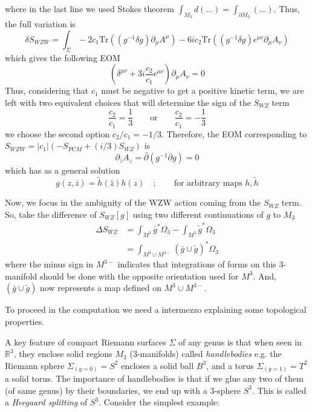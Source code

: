 \documentclass[a4paper,12pt]{article}
\numberwithin{equation}{section}
\numberwithin{thm}{section}
\numberwithin{exm}{section}
\newcommand{\p}{\partial}
\newcommand{\pb}{\bar\partial}
\newcommand{\tr}{\mathrm{Tr}}
\newcommand{\wt}{\widetilde}
\newcommand{\mo}{^{-1}}
\newcommand{\R}{{\mathbb R}}
\newcommand{\zb}{{\bar z}}
\newcommand{\<}{{\langle}}
\renewcommand{\>}{{\rangle}}
\renewcommand{\d}{{\delta}}
\newcommand{\D}{{\Delta}}
\newcommand{\e}{{\epsilon}}
\newcommand{\m}{{\mu}}
\newcommand{\n}{{\nu}}
\newcommand{\Om}{{\Omega}}
\renewcommand{\S}{{\Sigma}}
\begin{document}
where in the last line we used Stokes theorem $\int_{M_3} d(...) = \int_{\p M_3} (...)$. Thus, the full variation is
	\begin{equation}
	\d S_{WZW} = \int_\S -2c_1\tr((g^{-1}\d g)\p_\mu A^\m) -6ic_2 \tr((g^{-1}\delta g) \e^{\m\n}\p_\mu A_\nu)
	\end{equation}
which gives the following EOM
	\begin{equation}
	\left(\d^{\m\n} + 3i \frac{c_2}{c_1} \e^{\m\n}\right)\p_\m A_\n = 0
	\end{equation}
Thus, considering that $c_1$ must be negative to get a positive kinetic term, we are left with two equivalent choices that will determine the sign of the $S_{WZ}$ term
	\begin{equation}
	\frac{c_2}{c_1} = \frac{1}{3}\qquad\text{or}\qquad\frac{c_2}{c_1} = -\frac{1}{3}
	\end{equation}
we choose the second option $c_2/c_1 = - 1/3$. Therefore, the EOM corresponding to $S_{WZW} = |c_1|(-S_{PCM} + (i/3)S_{WZ})$ is
	\begin{equation}
	\p_\zb A_z = \pb(g\mo \p g) = 0
	\end{equation}
which has as a general solution
	\begin{equation}
	g(z,\zb) = \wt h(\zb) h(z)\quad;\qquad\text{for arbitrary maps }h, \wt h
	\end{equation}

Now, we focus in the ambiguity of the WZW action coming from the $S_{WZ}$ term. So, take the difference of $S_{WZ}[g]$ using two different continuations of $g$ to $M_3$
	\begin{align}
	\D S_{WZ} & = \int_{M^3} \bar g^*\Om_3 - \int_{M^3} \wt g^*\Om_3 \\
	& = \int_{M^3 \cup M^{3-}} (\bar g \cup \wt g)^* \Om_3
	\end{align}
where the minus sign in $M^{3-}$ indicates that integrations of forms on this 3-manifold should be done with the opposite orientation used for $M^3$. And, $(\bar g \cup \wt g)$ now represents a map defined on $M^3 \cup M^{3-}$.

To proceed in the computation we need a intermezzo explaining some topological properties.

A key feature of compact Riemann surfaces $\S$ of any genus is that when seen in $\R^3$, they enclose solid regions $M_3$ (3-manifolds) called {\it handlebodies} e.g. the Riemann sphere $\S_{(g=0)} = S^2$ encloses a solid ball $B^3$, and a torus $\S_{(g=1)} = T^2$ a solid torus. The importance of handlebodies is that if we glue any two of them (of same genus) by their boundaries, we end up with a 3-sphere $S^3$. This is called a {\it Heegaard splitting} of $S^3$. Consider the simplest example:
\end{document}
